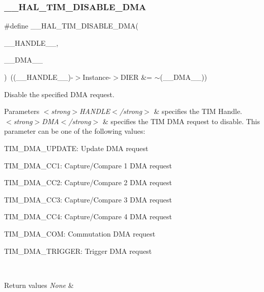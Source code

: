 \subsubsection{\texorpdfstring{\+\_\+\+\_\+\+H\+A\+L\+\_\+\+T\+I\+M\+\_\+\+D\+I\+S\+A\+B\+L\+E\+\_\+\+D\+MA}{\_\_HAL\_TIM\_DISABLE\_DMA}}
{\footnotesize\ttfamily \#define \+\_\+\+\_\+\+H\+A\+L\+\_\+\+T\+I\+M\+\_\+\+D\+I\+S\+A\+B\+L\+E\+\_\+\+D\+MA(\begin{DoxyParamCaption}\item[{}]{\+\_\+\+\_\+\+H\+A\+N\+D\+L\+E\+\_\+\+\_\+,  }\item[{}]{\+\_\+\+\_\+\+D\+M\+A\+\_\+\+\_\+ }\end{DoxyParamCaption})~((\+\_\+\+\_\+\+H\+A\+N\+D\+L\+E\+\_\+\+\_\+)-\/$>$Instance-\/$>$D\+I\+ER \&= $\sim$(\+\_\+\+\_\+\+D\+M\+A\+\_\+\+\_\+))}



Disable the specified D\+MA request. 


\begin{DoxyParams}{Parameters}
{\em $<$strong$>$\+H\+A\+N\+D\+L\+E$<$/strong$>$} & specifies the T\+IM Handle. \\
\hline
{\em $<$strong$>$\+D\+M\+A$<$/strong$>$} & specifies the T\+IM D\+MA request to disable. This parameter can be one of the following values\+: \begin{DoxyItemize}
\item T\+I\+M\+\_\+\+D\+M\+A\+\_\+\+U\+P\+D\+A\+TE\+: Update D\+MA request \item T\+I\+M\+\_\+\+D\+M\+A\+\_\+\+C\+C1\+: Capture/\+Compare 1 D\+MA request \item T\+I\+M\+\_\+\+D\+M\+A\+\_\+\+C\+C2\+: Capture/\+Compare 2 D\+MA request \item T\+I\+M\+\_\+\+D\+M\+A\+\_\+\+C\+C3\+: Capture/\+Compare 3 D\+MA request \item T\+I\+M\+\_\+\+D\+M\+A\+\_\+\+C\+C4\+: Capture/\+Compare 4 D\+MA request \item T\+I\+M\+\_\+\+D\+M\+A\+\_\+\+C\+OM\+: Commutation D\+MA request \item T\+I\+M\+\_\+\+D\+M\+A\+\_\+\+T\+R\+I\+G\+G\+ER\+: Trigger D\+MA request \end{DoxyItemize}
\\
\hline
\end{DoxyParams}

\begin{DoxyRetVals}{Return values}
{\em None} & \\
\hline
\end{DoxyRetVals}
\mbox{\label{group___t_i_m___exported___macros_ga31d67e905bc62e3142179dc4bbf8ba64}} 
